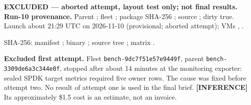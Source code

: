 \textbf{EXCLUDED --- aborted attempt, layout test only; not final results.} \textbf{Run-10 provenance.} Parent ; fleet ; package SHA-256 ; source ; dirty true. Launch about 21:29 UTC on 2026-11-10 (provisional; aborted attempt); VMs , .

SHA-256: manifest ; binary ; source tree ; matrix .

\textbf{Excluded first attempt.} Fleet \texttt{bench-9dc7f51e57e9449f}, parent \texttt{bench-3309de6a3c344e0f}, stopped after about 14 minutes at the monitoring exporter: sealed SPDK target metrics required five owner rows. The cause was fixed before attempt two. No result of attempt one is used in the final brief. \textbf{[INFERENCE]} Its approximately \$1.5 cost is an estimate, not an invoice.
